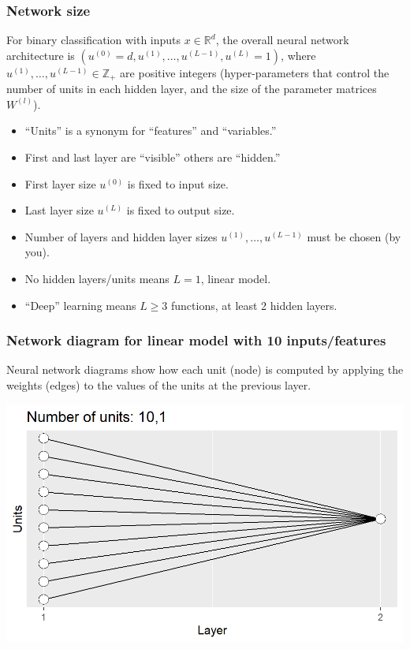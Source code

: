 \documentclass{beamer}
\begin{document}
\begin{frame}
  \frametitle{Network size}
For binary classification
with inputs $x\in\mathbb R^d$, the overall neural network architecture
is $(u^{(0)}=d, u^{(1)}, \dots, u^{(L-1)}, u^{(L)}=1)$, where
$u^{(1)},\dots, u^{(L-1)}\in\mathbb Z_+$ are positive integers
(hyper-parameters that control the number of units in each hidden
layer, and the size of the parameter matrices $W^{(l)}$).
\begin{itemize}
\item ``Units'' is a synonym for ``features'' and ``variables.''
\item First and last layer are ``visible'' others are ``hidden.''
\item First layer size $u^{(0)}$ is fixed to input size.
\item Last layer size $u^{(L)}$ is fixed to output size.
\item Number of layers and hidden layer sizes
  $u^{(1)},\dots, u^{(L-1)}$ must be chosen (by you).
\item No hidden layers/units means $L=1$, linear model.
\item  ``Deep'' learning means $L\geq 3$ functions, at least 2 hidden
  layers.
\end{itemize}
\end{frame}

\begin{frame}
  \frametitle{Network diagram for linear model with 10 inputs/features}
  Neural network
  diagrams show how each unit (node) is computed by applying the
  weights (edges) to the values of the units at the previous layer.

\includegraphics[width=\textwidth]{figure-architecture-linear}
\end{frame}
\end{document}
